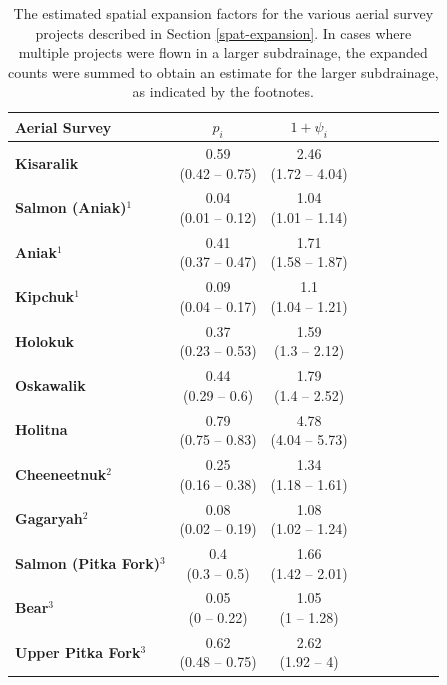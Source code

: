 \documentclass[12pt,]{book}
\theoremstyle{definition}
\theoremstyle{definition}
\theoremstyle{definition}
\theoremstyle{remark}
\begin{document}
\begin{table}[H]

\caption{\label{tab:spat-expand-table}The estimated spatial expansion factors for the various aerial survey projects described in Section \ref{spat-expansion}.
      In cases where multiple projects were flown in a larger subdrainage, the expanded counts
      were summed to obtain an estimate for the larger subdrainage, as indicated by the footnotes.}
\centering
\begin{tabular}[t]{>{\bfseries}lcclcclcc}
\toprule
Aerial Survey & $p_i$ & $1 + \psi_i$\\
\midrule
Kisaralik & \makecell[c]{0.59\\(0.42 -- 0.75)} & \makecell[c]{2.46\\(1.72 -- 4.04)}\\
Salmon (Aniak)$^1$ & \makecell[c]{0.04\\(0.01 -- 0.12)} & \makecell[c]{1.04\\(1.01 -- 1.14)}\\
Aniak$^1$ & \makecell[c]{0.41\\(0.37 -- 0.47)} & \makecell[c]{1.71\\(1.58 -- 1.87)}\\
Kipchuk$^1$ & \makecell[c]{0.09\\(0.04 -- 0.17)} & \makecell[c]{1.1\\(1.04 -- 1.21)}\\
Holokuk & \makecell[c]{0.37\\(0.23 -- 0.53)} & \makecell[c]{1.59\\(1.3 -- 2.12)}\\
\addlinespace
Oskawalik & \makecell[c]{0.44\\(0.29 -- 0.6)} & \makecell[c]{1.79\\(1.4 -- 2.52)}\\
Holitna & \makecell[c]{0.79\\(0.75 -- 0.83)} & \makecell[c]{4.78\\(4.04 -- 5.73)}\\
Cheeneetnuk$^2$ & \makecell[c]{0.25\\(0.16 -- 0.38)} & \makecell[c]{1.34\\(1.18 -- 1.61)}\\
Gagaryah$^2$ & \makecell[c]{0.08\\(0.02 -- 0.19)} & \makecell[c]{1.08\\(1.02 -- 1.24)}\\
Salmon (Pitka Fork)$^3$ & \makecell[c]{0.4\\(0.3 -- 0.5)} & \makecell[c]{1.66\\(1.42 -- 2.01)}\\
\addlinespace
Bear$^3$ & \makecell[c]{0.05\\(0 -- 0.22)} & \makecell[c]{1.05\\(1 -- 1.28)}\\
Upper Pitka Fork$^3$ & \makecell[c]{0.62\\(0.48 -- 0.75)} & \makecell[c]{2.62\\(1.92 -- 4)}\\
\bottomrule
\end{tabular}
\end{table}
\end{document}
